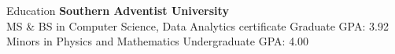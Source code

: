 \begin{rSection}{Education}
  {\bf Southern Adventist University} \hfill {} \\
  MS \& BS in Computer Science, Data Analytics certificate \hfill Graduate GPA: {3.92} \\
  Minors in Physics and Mathematics \hfill Undergraduate GPA: {4.00}
\end{rSection}
